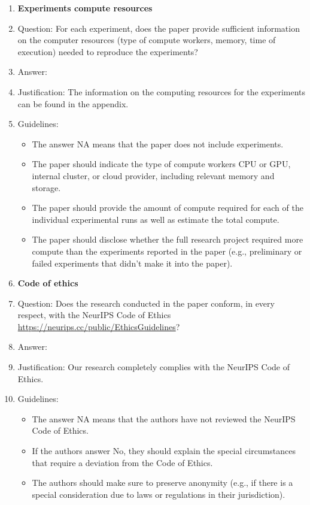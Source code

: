 \documentclass{article}
\theoremstyle{remark}
\begin{document}
\begin{enumerate}
\item {\bf Experiments compute resources}
    \item[] Question: For each experiment, does the paper provide sufficient information on the computer resources (type of compute workers, memory, time of execution) needed to reproduce the experiments?
    \item[] Answer: \answerYes{} %
    \item[] Justification: The information on the computing resources for the experiments can be found in the appendix.
    \item[] Guidelines:
    \begin{itemize}
        \item The answer NA means that the paper does not include experiments.
        \item The paper should indicate the type of compute workers CPU or GPU, internal cluster, or cloud provider, including relevant memory and storage.
        \item The paper should provide the amount of compute required for each of the individual experimental runs as well as estimate the total compute. 
        \item The paper should disclose whether the full research project required more compute than the experiments reported in the paper (e.g., preliminary or failed experiments that didn't make it into the paper). 
    \end{itemize}
    
\item {\bf Code of ethics}
    \item[] Question: Does the research conducted in the paper conform, in every respect, with the NeurIPS Code of Ethics \url{https://neurips.cc/public/EthicsGuidelines}?
    \item[] Answer: \answerYes{} %
    \item[] Justification: Our research completely complies with the NeurIPS Code of Ethics.
    \item[] Guidelines:
    \begin{itemize}
        \item The answer NA means that the authors have not reviewed the NeurIPS Code of Ethics.
        \item If the authors answer No, they should explain the special circumstances that require a deviation from the Code of Ethics.
        \item The authors should make sure to preserve anonymity (e.g., if there is a special consideration due to laws or regulations in their jurisdiction).
    \end{itemize}



\end{enumerate}
\end{document}
